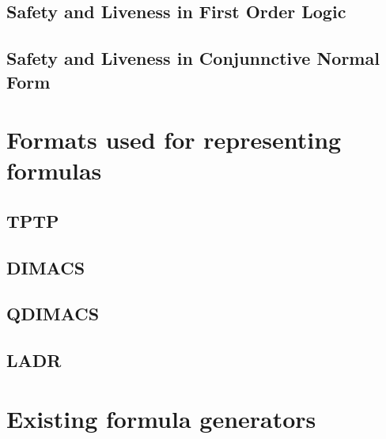 \subsection{Safety and Liveness in First Order Logic}

\subsection{Safety and Liveness in Conjunnctive Normal Form}

\section{Formats used for representing formulas}

\subsection{TPTP}

\subsection{DIMACS}

\subsection{QDIMACS}

\subsection{LADR}

\section{Existing formula generators}
